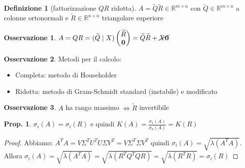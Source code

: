 \documentclass[a4paper,10pt]{article}
\theoremstyle{definition}
\newcommand{\bv}{\boldsymbol} %
\newcommand{\cv}[2]{\begin{pmatrix} #1 \\ #2 \end{pmatrix}} %
\theoremstyle{indentdefinition}
\newtheorem{defn}{Definizione}[section]
\theoremstyle{indenttheorem}
\newtheorem{prop}{Prop.}
\theoremstyle{myremark}
\newtheorem*{rem*}{Osservazione}
\theoremstyle{indentgeneral}
\theoremstyle{plain}
\theoremstyle{plain}
\begin{document}
\begin{defn}[fattorizzazione $QR$ ridotta]
$A=\widetilde{Q}\widetilde{R}\in\mathbb{R}^{m\times n}$ con $\widetilde{Q}\in\mathbb{R}^{m\times n}$
a colonne ortonormali e $\widetilde{R}\in\mathbb{R}^{n\times n}$
triangolare superiore
\end{defn}

\begin{rem*}
    $A=QR=(\widetilde{Q}\mid X)\cv{\widetilde{R}}{\bv{0}}=\widetilde{Q}\widetilde{R}+\cancel{X\bv{0}}$
\end{rem*}

\begin{rem*}
    Metodi per il calcolo:
    \begin{itemize}
        \item Completa: metodo di Householder 
        \item Ridotta: metodo di Gram-Schmidt standard (instabile) e modificato
    \end{itemize}
\end{rem*}

\begin{rem*}
    $A$ ha rango massimo $\iff\widetilde{R}$ invertibile
\end{rem*}

\begin{prop}
    $\sigma_i(A)=\sigma_i(R)$ e quindi $K(A)=\frac{\sigma_1(A)}{\sigma_n(A)}=K(R)$
\end{prop}
\begin{proof}
Abbiamo: $A^TA=V\Sigma^TU^TU\Sigma V^T=V\Sigma^T\Sigma V^T$ quindi $\boxed{\sigma_i(A)=\sqrt{\lambda(A^TA)}}$. \\
Allora $\sigma_i(A)=\sqrt{\lambda(A^TA)}=\sqrt{\lambda(R^TQ^TQR)}=\sqrt{\lambda(R^TR)}=\sigma_i(R)$
\end{proof}
\end{document}
